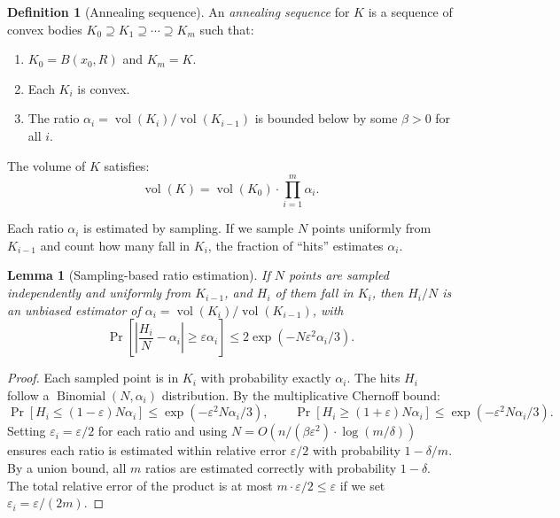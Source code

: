 \documentclass[twoside,12pt]{book}
\theoremstyle{plain}
\newtheorem{lemma}[theorem]{Lemma}
\theoremstyle{definition}
\newtheorem{definition}[theorem]{Definition}
\theoremstyle{remark}
\begin{document}
\begin{definition}[Annealing sequence]
An \emph{annealing sequence} for $K$ is a sequence of convex bodies $K_0 \supseteq K_1 \supseteq \cdots \supseteq K_m$ such that:
\begin{enumerate}[nosep]
    \item $K_0 = B(x_0, R)$ and $K_m = K$.
    \item Each $K_i$ is convex.
    \item The ratio $\alpha_i = \operatorname{vol}(K_i)/\operatorname{vol}(K_{i-1})$ is bounded below by some $\beta > 0$ for all $i$.
\end{enumerate}
\end{definition}

The volume of $K$ satisfies:
\[
\operatorname{vol}(K) = \operatorname{vol}(K_0) \cdot \prod_{i=1}^m \alpha_i.
\]

Each ratio $\alpha_i$ is estimated by sampling. If we sample $N$ points uniformly from $K_{i-1}$ and count how many fall in $K_i$, the fraction of ``hits'' estimates $\alpha_i$.

\begin{lemma}[Sampling-based ratio estimation]
\label{lem:ratio-est}
If $N$ points are sampled independently and uniformly from $K_{i-1}$, and $H_i$ of them fall in $K_i$, then $H_i/N$ is an unbiased estimator of $\alpha_i = \operatorname{vol}(K_i)/\operatorname{vol}(K_{i-1})$, with
\[
\Pr\!\left[\left|\frac{H_i}{N} - \alpha_i\right| \geq \varepsilon \alpha_i\right] \leq 2 \exp(-N \varepsilon^2 \alpha_i / 3).
\]
\end{lemma}

\begin{proof}
Each sampled point is in $K_i$ with probability exactly $\alpha_i$. The hits $H_i$ follow a $\operatorname{Binomial}(N, \alpha_i)$ distribution. By the multiplicative Chernoff bound:
\[
\Pr[H_i \leq (1 - \varepsilon) N \alpha_i] \leq \exp(-\varepsilon^2 N \alpha_i / 3), \qquad \Pr[H_i \geq (1 + \varepsilon) N \alpha_i] \leq \exp(-\varepsilon^2 N \alpha_i / 3).
\]
Setting $\varepsilon_i = \varepsilon/2$ for each ratio and using $N = O(n / (\beta \varepsilon^2) \cdot \log(m/\delta))$ ensures each ratio is estimated within relative error $\varepsilon/2$ with probability $1 - \delta/m$. By a union bound, all $m$ ratios are estimated correctly with probability $1 - \delta$. The total relative error of the product is at most $m \cdot \varepsilon/2 \leq \varepsilon$ if we set $\varepsilon_i = \varepsilon/(2m)$.
\end{proof}
\end{document}

